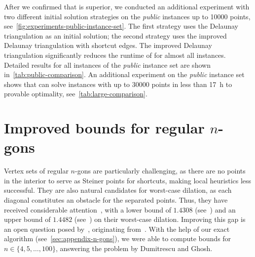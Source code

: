 After we confirmed that \binmdt{} is superior,
we conducted an additional experiment with two different initial solution strategies on the \emph{public} instances up to \num{10000} points, see~\cref{fig:experiments-public-instance-set}.
The first strategy uses the Delaunay triangulation as an initial solution; the second strategy uses the improved Delaunay triangulation with shortcut edges.
The improved Delaunay triangulation significantly reduces the runtime of \binmdt{} for almost all instances.
Detailed results for all instances of the \emph{public} instance set are shown in~\cref{tab:public-comparison}.
An additional experiment on the \emph{public} instance set shows that \binmdt{} can solve instances with up to \num{30000} points in less than \qty{17}{h} to provable optimality, see~\cref{tab:large-comparison}.

\section{Improved bounds for regular \texorpdfstring{$n$}{n}-gons}\label{sec:n-gon-lb}
Vertex sets of regular $n$-gons are particularly challenging, as there are no points in the
interior to serve as Steiner points for shortcuts, making 
local heuristics less successful. They are also natural candidates for worst-case
dilation, as each diagonal constitutes an obstacle for the separated points.
Thus, they have received considerable
attention~\cite{mulzer2004minimum,DBLP:journals/ijcga/DumitrescuG16,DBLP:journals/comgeo/SattariI19},
with a lower bound of $1.4308$ (see~\cite{DBLP:journals/ijcga/DumitrescuG16}) and an upper bound
of $1.4482$ (see~\cite{DBLP:journals/comgeo/SattariI19})
on their worst-case dilation. 
Improving this gap is an open question posed by~\cite[Problem 1]{DBLP:journals/ijcga/DumitrescuG16}, originating
from~\cite{DBLP:journals/comgeo/BoseS13, DBLP:conf/iccit/Kanj13}.
With the help of our exact algorithm (see~\cref{sec:appendix-n-gons}),
we were able to compute bounds for $n\in\{4,5,\dots,100\}$,
answering the problem by Dumitrescu and Ghosh.

